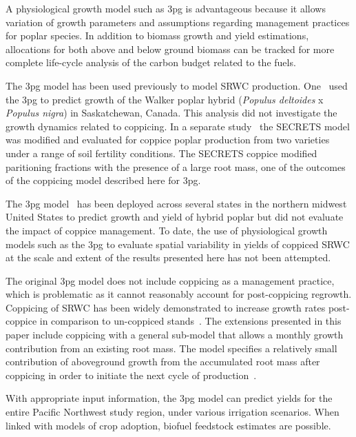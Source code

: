 \documentclass[preprint,review,12pt]{elsarticle}
\begin{document}
A physiological growth model such as \ac{3pg} is advantageous because
it allows variation of growth parameters and assumptions regarding
management practices for poplar species.  In addition to biomass
growth and yield estimations, allocations for both above and below
ground biomass can be tracked for more complete life-cycle analysis of
the carbon budget related to the fuels.

The \ac{3pg} model has been used previously to model \ac{SRWC}
production. One~\cite{Amichev2010} used the \ac{3pg} to predict growth
of the Walker poplar hybrid (\textit{Populus deltoides} x
\textit{Populus nigra}) in Saskatchewan, Canada. This analysis did not
investigate the growth dynamics related to coppicing. In a separate
study~\cite{Deckmyn2004} the \ac{SECRETS} model was modified and
evaluated for coppice poplar production from two varieties under a
range of soil fertility conditions.  The \ac{SECRETS} coppice modified
paritioning fractions with the presence of a large root mass, one of
the outcomes of the coppicing model described here for \ac{3pg}.

The \ac{3pg} model~\cite{Headlee2012} has been deployed across several
states in the northern midwest United States to predict growth and
yield of hybrid poplar but did not evaluate the impact of coppice
management.  To date, the use of physiological growth models such as
the \ac{3pg} to evaluate spatial variability in yields of coppiced
\ac{SRWC} at the scale and extent of the results presented here has
not been attempted.

The original \ac{3pg} model does not include coppicing as a management
practice, which is problematic as it cannot reasonably account for
post-coppicing regrowth.  Coppicing of \ac{SRWC} has been widely
demonstrated to increase growth rates post-coppice in comparison to
un-coppiced stands~\cite{Verwijst1996,Afas2008a,Sennerby-Forsse1992}.
The extensions presented in this paper include coppicing with a
general sub-model that allows a monthly growth contribution from an
existing root mass.  The model specifies a relatively small
contribution of aboveground growth from the accumulated root mass
after coppicing in order to initiate the next cycle of
production~\cite{Deckmyn2004}.

With appropriate input information, the \ac{3pg} model can predict
yields for the entire Pacific Northwest study region, under various
irrigation scenarios.  When linked with models of crop adoption,
biofuel feedstock estimates are possible.
\end{document}
